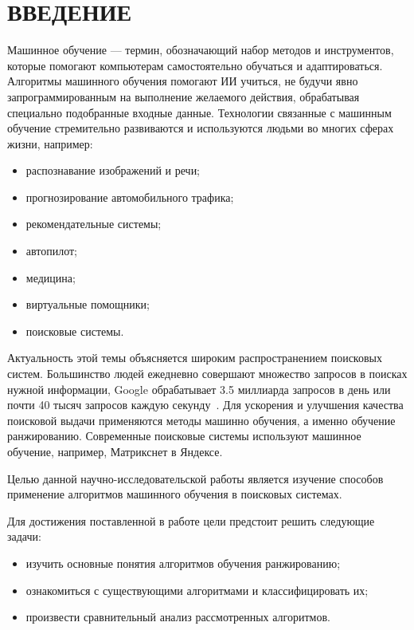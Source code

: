 \chapter*{ВВЕДЕНИЕ}

Машинное обучение --- термин, обозначающий набор методов и инструментов, которые помогают компьютерам самостоятельно обучаться и адаптироваться. Алгоритмы машинного обучения помогают ИИ учиться, не будучи явно запрограммированным на выполнение желаемого действия, обрабатывая специально подобранные входные данные. Технологии связанные с машинным обучение стремительно развиваются и используются людьми во многих сферах жизни, например:

\begin{itemize}[label=---]
	\item распознавание изображений и речи;
	\item прогнозирование автомобильного трафика;
	\item рекомендательные системы;
	\item автопилот;
	\item медицина;
	\item виртуальные помощники;
	\item поисковые системы.
\end{itemize}

Актуальность этой темы объясняется широким распространением поисковых систем. Большинство людей ежедневно совершают множество запросов в поисках нужной информации, Google обрабатывает 3.5 миллиарда запросов в день или почти 40 тысяч запросов каждую секунду~\cite{google}. Для ускорения и улучшения качества поисковой выдачи применяются методы машинно обучения, а именно обучение ранжированию. Современные поисковые системы используют машинное обучение, например, Матрикснет в Яндексе.

Целью  данной научно-исследовательской работы является изучение способов применение алгоритмов машинного обучения в поисковых системах. 

Для достижения поставленной в работе цели предстоит решить следующие задачи:
\begin{itemize}[label=---]
	\item изучить основные понятия алгоритмов обучения ранжированию;
	\item ознакомиться с существующими алгоритмами и классифицировать их;
	\item произвести сравнительный анализ рассмотренных алгоритмов.
\end{itemize}


